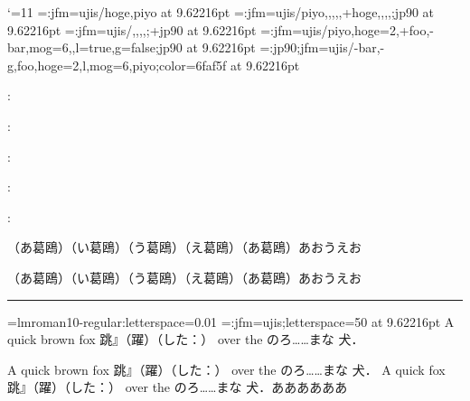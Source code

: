 

\catcode`\@=11
\jfont \testA=\ltj@stdmcfont:jfm=ujis/hoge,piyo at 9.62216pt
\jfont \testB=\ltj@stdmcfont:jfm=ujis/{piyo,,,,,+hoge,,,,};jp90 at 9.62216pt
\jfont \testC=\ltj@stdgtfont:jfm=ujis/,,,,;+jp90 at 9.62216pt
\jfont \testE=\ltj@stdmcfont:jfm=ujis/piyo,hoge=2,+foo,-bar,mog=6,,l=true,g=false;jp90 at 9.62216pt
\jfont \testE=\ltj@stdmcfont:jp90;jfm=ujis/{-bar,-g,foo,hoge=2,l,mog=6,piyo};color=6faf5f at 9.62216pt

\def\DISP#1{{\noindent\tentt \string#1: \meaning#1}\par}

\DISP\testA
\DISP\testB
\DISP\testC
\DISP\testD
\DISP\testE

{\testA （あ葛鴎）}{\testB （い葛鴎）}{\testC （う葛鴎）}（え葛鴎）{\tengt（あ葛鴎）}{\testE あおうえお}\par

{\testA （あ葛鴎）}{\testB （い葛鴎）}{\testC （う葛鴎）}（え葛鴎）{\tengt（あ葛鴎）}{\testE あおうえお}\par

\medskip
\hrule
\medskip
\font\testOA=lmroman10-regular:letterspace=0.01
\jfont\testF=\ltj@stdmcfont:jfm=ujis;letterspace=50 at 9.62216pt
{\testOA \testF
  A quick brown fox 跳』\inhibitglue （躍）（した：） over the のろ……まな 犬．
}


{\testOA \testF
  A quick brown fox 跳』\inhibitglue （躍）（した：） over the のろ……まな 犬．
  A quick fox 跳』\inhibitglue （躍）（した：） over the のろ……まな 犬．ああああああ

}


\bye
